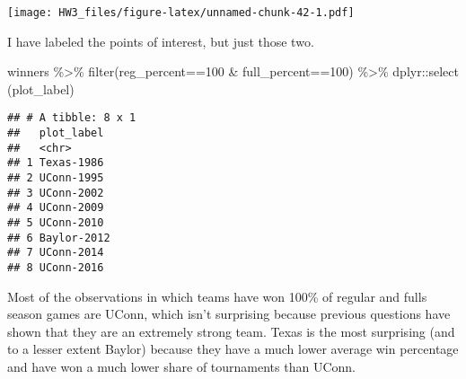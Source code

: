 \documentclass[
]{article}
\newenvironment{Shaded}{\begin{snugshade}}{\end{snugshade}}
\newcommand{\AttributeTok}[1]{\textcolor[rgb]{0.77,0.63,0.00}{#1}}
\newcommand{\DecValTok}[1]{\textcolor[rgb]{0.00,0.00,0.81}{#1}}
\newcommand{\FunctionTok}[1]{\textcolor[rgb]{0.00,0.00,0.00}{#1}}
\newcommand{\NormalTok}[1]{#1}
\newcommand{\OtherTok}[1]{\textcolor[rgb]{0.56,0.35,0.01}{#1}}
\newcommand{\SpecialCharTok}[1]{\textcolor[rgb]{0.00,0.00,0.00}{#1}}
\newcommand{\StringTok}[1]{\textcolor[rgb]{0.31,0.60,0.02}{#1}}
\begin{document}
\begin{Shaded}
\end{Shaded}

\texttt{[image: HW3\_files/figure-latex/unnamed-chunk-42-1.pdf]}

I have labeled the points of interest, but just those two.

\begin{Shaded}
\begin{Highlighting}[]
\NormalTok{winners }\SpecialCharTok{\%\textgreater{}\%} \FunctionTok{filter}\NormalTok{(reg\_percent}\SpecialCharTok{==}\DecValTok{100} \SpecialCharTok{\&}\NormalTok{ full\_percent}\SpecialCharTok{==}\DecValTok{100}\NormalTok{) }\SpecialCharTok{\%\textgreater{}\%} 
\NormalTok{  dplyr}\SpecialCharTok{::}\FunctionTok{select}\NormalTok{ (plot\_label)}
\end{Highlighting}
\end{Shaded}

\begin{verbatim}
## # A tibble: 8 x 1
##   plot_label 
##   <chr>      
## 1 Texas-1986 
## 2 UConn-1995 
## 3 UConn-2002 
## 4 UConn-2009 
## 5 UConn-2010 
## 6 Baylor-2012
## 7 UConn-2014 
## 8 UConn-2016
\end{verbatim}

Most of the observations in which teams have won 100\% of regular and
fulls season games are UConn, which isn't surprising because previous
questions have shown that they are an extremely strong team. Texas is
the most surprising (and to a lesser extent Baylor) because they have a
much lower average win percentage and have won a much lower share of
tournaments than UConn.
\end{document}
